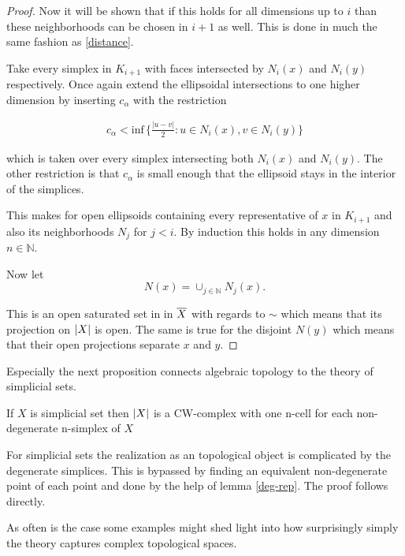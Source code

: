\documentclass[../../main.tex]{subfiles}
\begin{document}
\begin{proof}
        Now it will be shown that if this holds for all dimensions up to $i$ than these neighborhoods can be chosen in $i+1$ as well. This is done in much the same fashion as \eqref{distance}.

        Take every simplex in $K_{i+1}$ with faces intersected by $N_i(x)$ and $N_i(y)$ respectively. Once again extend the ellipsoidal intersections to one higher dimension by inserting $c_\alpha$ with the restriction

        \begin{align*}
            c_\alpha < \text{inf}\,\{\frac{|u-v|}{2}: u \in N_{i}(x), v \in N_i(y)\}
        \end{align*}

        which is taken over every simplex intersecting both $N_i(x)$ and $N_i(y)$. The other restriction is that $c_\alpha$ is small enough that the ellipsoid stays in the interior of the simplices.

        This makes for open ellipsoids containing every representative of $x$ in $K_{i+1}$ and also its neighborhoods $N_j$ for $j < i$. By induction this holds in any dimension $n \in \mathbb{N}$.

        Now let \[N(x) = \cup_{j \in \mathbb{N}} N_j(x).\]

        This is an open saturated set in in $\bigGeom X$ with regards to $\sim$ which means that its projection on $\geom[X]$ is open. The same is true for the disjoint $N(y)$ which means that their open projections separate $x$ and $y$.
    \end{proof}
    
    Especially the next proposition connects algebraic topology to the theory of simplicial sets.

    \begin{proposition}\label{is-CW}
        If $X$ is simplicial set then $\geom[X]$ is a CW-complex with one n-cell for each non-degenerate n-simplex of $X$ 
    \end{proposition}

    For simplicial sets the realization as an topological object is complicated by the degenerate simplices. This is bypassed by finding an equivalent non-degenerate point of each point and done by the help of lemma \ref{deg-rep}. The proof follows directly.

    As often is the case some examples might shed light into how surprisingly simply the theory captures complex topological spaces.

\end{document}
